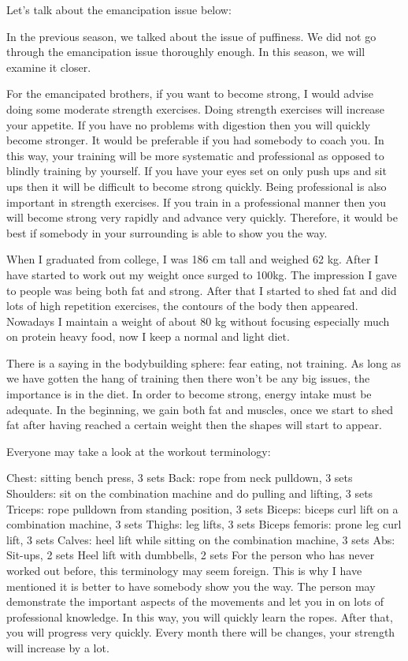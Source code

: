 \documentclass[
]{book}
\begin{document}
Let's talk about the emancipation issue below:

In the previous season, we talked about the issue of puffiness. We did not go through the emancipation issue thoroughly enough. In this season, we will examine it closer.

For the emancipated brothers, if you want to become strong, I would advise doing some moderate strength exercises. Doing strength exercises will increase your appetite. If you have no problems with digestion then you will quickly become stronger. It would be preferable if you had somebody to coach you. In this way, your training will be more systematic and professional as opposed to blindly training by yourself. If you have your eyes set on only push ups and sit ups then it will be difficult to become strong quickly. Being professional is also important in strength exercises. If you train in a professional manner then you will become strong very rapidly and advance very quickly. Therefore, it would be best if somebody in your surrounding is able to show you the way.

When I graduated from college, I was 186 cm tall and weighed 62 kg. After I have started to work out my weight once surged to 100kg. The impression I gave to people was being both fat and strong. After that I started to shed fat and did lots of high repetition exercises, the contours of the body then appeared. Nowadays I maintain a weight of about 80 kg without focusing especially much on protein heavy food, now I keep a normal and light diet.

There is a saying in the bodybuilding sphere: fear eating, not training. As long as we have gotten the hang of training then there won't be any big issues, the importance is in the diet. In order to become strong, energy intake must be adequate. In the beginning, we gain both fat and muscles, once we start to shed fat after having reached a certain weight then the shapes will start to appear.

Everyone may take a look at the workout terminology:

Chest: sitting bench press, 3 sets
Back: rope from neck pulldown, 3 sets
Shoulders: sit on the combination machine and do pulling and lifting, 3 sets
Triceps: rope pulldown from standing position, 3 sets
Biceps: biceps curl lift on a combination machine, 3 sets
Thighs: leg lifts, 3 sets
Biceps femoris: prone leg curl lift, 3 sets
Calves: heel lift while sitting on the combination machine, 3 sets
Abs: Sit-ups, 2 sets
Heel lift with dumbbells, 2 sets
For the person who has never worked out before, this terminology may seem foreign. This is why I have mentioned it is better to have somebody show you the way. The person may demonstrate the important aspects of the movements and let you in on lots of professional knowledge. In this way, you will quickly learn the ropes. After that, you will progress very quickly. Every month there will be changes, your strength will increase by a lot.
\end{document}
